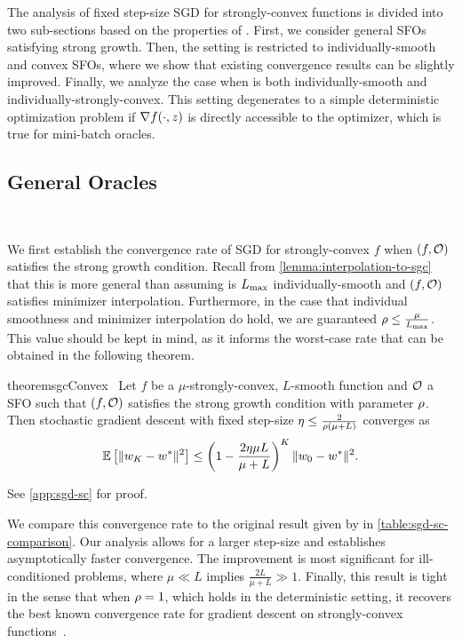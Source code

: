 The analysis of fixed step-size \ac{SGD} for strongly-convex functions is divided into two sub-sections based on the properties of \oracle{}.
First, we consider general \acp{SFO} satisfying strong growth. 
Then, the setting is restricted to individually-smooth and convex \acp{SFO}, where we show that existing convergence results can be slightly improved.
Finally, we analyze the case when \oracle{} is both individually-smooth and individually-strongly-convex.
This setting degenerates to a simple deterministic optimization problem if \( \grad(\cdot, z) \) is directly accessible to the optimizer, which is true for mini-batch oracles. 

\subsection{General Oracles}~\label{sec:sgd-sc-general}

We first establish the convergence rate of \ac{SGD} for strongly-convex \( f \) when \( \rbr{f, \oracle} \) satisfies the strong growth condition. 
Recall from \autoref{lemma:interpolation-to-sgc} that this is more general than assuming \oracle{} is \( \Lmax \) individually-smooth and \( \rbr{f, \oracle} \) satisfies minimizer interpolation. 
Furthermore, in the case that individual smoothness and minimizer interpolation do hold, we are guaranteed \( \sgc \leq \frac{\mu}{\Lmax} \).
This value should be kept in mind, as it informs the worst-case rate that can be obtained in the following theorem. 

\begin{restatable}{theorem}{sgcConvex}~\label{thm:sgc-convex}
    Let \( f \) be a \( \mu \)-strongly-convex, \( L \)-smooth function and \( \oracle{} \) a \ac{SFO} such that \( \rbr{f, \oracle{}} \) satisfies the strong growth condition with parameter \( \sgc \).
    Then stochastic gradient descent with fixed step-size \( \eta \leq \frac{2}{\sgc(\mu + L)} \) converges as 
    \[ \E\sbr{\norm{\w_{K} - \wopt}^2} \leq \rbr{1 - \frac{2\eta \mu L}{\mu + L}}^K \norm{\w_0 - \wopt}^2. \] 
\end{restatable}%
\noindent See \autoref{app:sgd-sc} for proof.\hfill \break

We compare this convergence rate to the original result given by \citet[Section 6]{schmidt2013fast} in \autoref{table:sgd-sc-comparison}.
Our analysis allows for a larger step-size and establishes asymptotically faster convergence.
The improvement is most significant for ill-conditioned problems, where \( \mu \ll L \) implies \( \frac{2 L}{\mu + L} \gg 1 \). 
Finally, this result is tight in the sense that when \( \sgc = 1 \), which holds in the deterministic setting, it recovers the best known convergence rate for gradient descent on strongly-convex functions~\citep[Theorem 3.12]{bubeck2015convex}.

